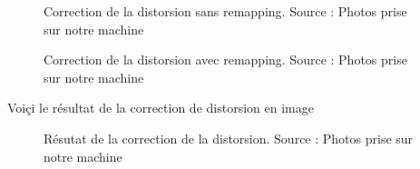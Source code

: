 \begin{figure}[H]%
	\center%
	\setlength{\fboxsep}{5pt}%
	\setlength{\fboxrule}{0.5pt}%
	\caption[Correction de la distorsion sans remapping]{Correction de la distorsion sans remapping. Source : Photos prise sur notre machine}
	\label{fig:Correction de la distorsion sans remapping}
\end{figure}

\begin{figure}[H]%
	\center%
	\setlength{\fboxsep}{5pt}%
	\setlength{\fboxrule}{0.5pt}%
	\caption[Correction de la distorsion avec remapping]{Correction de la distorsion avec remapping. Source : Photos prise sur notre machine}
	\label{fig:Correction de la distorsion avec remapping}
\end{figure}

Voiçi le résultat de la correction de distorsion en image
\begin{figure}[H]%
	\center%
	\setlength{\fboxsep}{5pt}%
	\setlength{\fboxrule}{0.5pt}%
	\caption[Résutat de la correction de la distorsion]{Résutat de la correction de la distorsion. Source : Photos prise sur notre machine}
	\label{fig:Résutat de la correction de la distorsion}
\end{figure}


